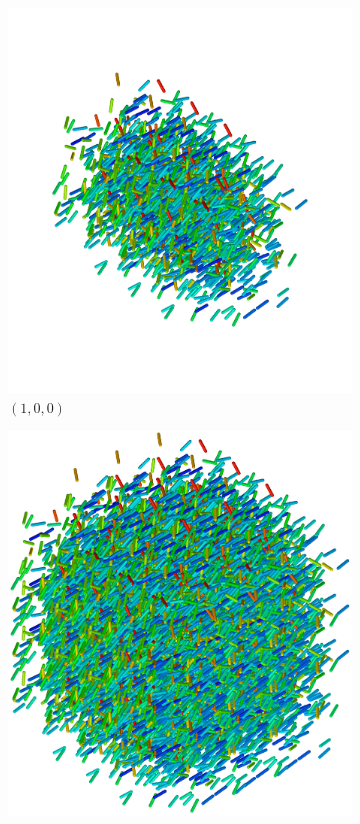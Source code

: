\begin{figure}
\begin{center}
\begin{subfigure}{0.3\textwidth}
      \includegraphics[width=\textwidth]{assets/images/periodic/2}
      \caption{$(1,0,0)$}
      \label{fig:periodic_2}
    \end{subfigure}
        \begin{subfigure}{0.3\textwidth}
      \includegraphics[width=\textwidth]{assets/images/periodic/3}

\end{subfigure}
\end{center}
\end{figure}
